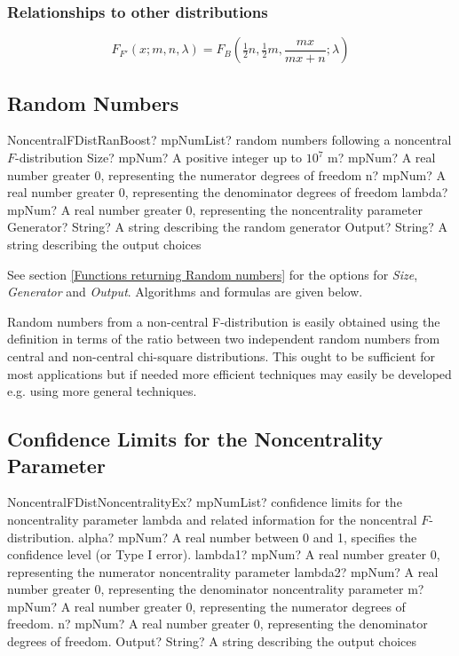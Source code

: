 \subsubsection{Relationships to other distributions}
\begin{equation}
F_{F'}(x;m,n,\lambda) = F_B\left(\tfrac{1}{2} n, \tfrac{1}{2} m,\frac{mx}{mx+n};\lambda\right)
\end{equation}

\subsection{Random Numbers}
\label{NonCentralFDistributionRandom}


\begin{mpFunctionsExtract}
	\mpFunctionSixNotImplemented
	{NoncentralFDistRanBoost? mpNumList? random numbers following a noncentral $F$-distribution}
	{Size? mpNum? A positive integer up to $10^7$}
	{m? mpNum? A real number greater 0, representing the numerator  degrees of freedom}
	{n? mpNum? A real number greater 0, representing the denominator degrees of freedom}
	{lambda? mpNum? A real number greater 0, representing the noncentrality parameter}
	{Generator? String? A string describing the random generator}
	{Output? String? A string describing the output choices}
\end{mpFunctionsExtract}

\vspace{0.3cm}
See section \ref{Functions returning Random numbers} for the options for  {\itshape\sffamily Size},  {\itshape\sffamily Generator} and {\itshape\sffamily Output}. Algorithms and formulas are given below.

Random numbers from a non-central F-distribution is easily obtained using the definition in terms of the ratio between two independent random numbers from central and non-central chi-square distributions. This ought to be sufficient for most applications but if needed more efficient techniques may easily be developed e.g. using more general techniques.



\subsection{Confidence Limits for the Noncentrality Parameter}
\label{NoncentralFNoncentrality}

\begin{mpFunctionsExtract}
	\mpFunctionSixNotImplemented
	{NoncentralFDistNoncentralityEx? mpNumList? confidence limits for the noncentrality parameter lambda and related information for the noncentral $F$-distribution.}
	{alpha? mpNum? A real number between 0 and 1, specifies the confidence level (or Type I error).}
	{lambda1? mpNum? A real number greater 0, representing the numerator noncentrality parameter}
	{lambda2? mpNum? A real number greater 0, representing the denominator noncentrality parameter}
	{m? mpNum? A real number greater 0, representing the numerator  degrees of freedom.}
	{n? mpNum? A real number greater 0, representing the denominator degrees of freedom.}
	{Output? String? A string describing the output choices}
\end{mpFunctionsExtract}


